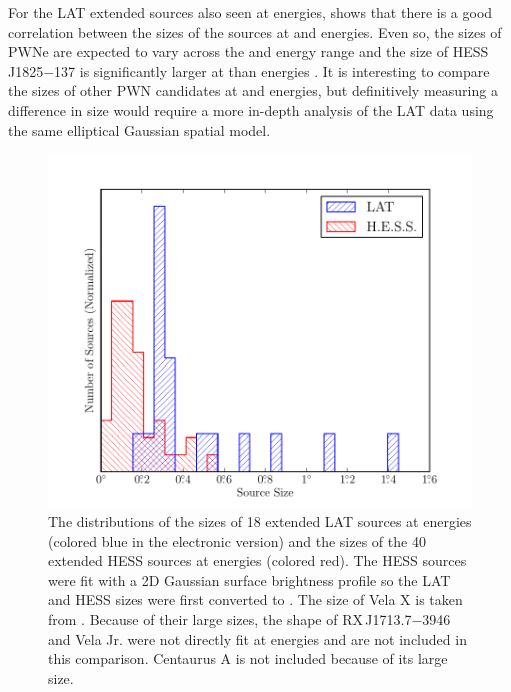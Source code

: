For the LAT extended sources also seen at \tev energies,
 shows that there is a good correlation between
the sizes of the sources at \gev and \tev energies. Even so, the sizes
of PWNe are expected to vary across the \gev and \tev energy range and
the size of HESS\,J1825$-$137 is significantly larger at \gev than \tev
energies \citep{grondin_2011a_detection-pulsar}.  It is interesting to
compare the sizes of other PWN candidates at \gev and \tev energies, but
definitively measuring a difference in size would require a more in-depth
analysis of the LAT data using the same elliptical Gaussian spatial model.

\begin{figure}[htbp]
  \includegraphics{chapters/extended_search/figures/summary_plots/gev_vs_tev_histogram_color.pdf}
  \caption{The distributions of the sizes of 18 extended LAT sources at
  \gev energies (colored blue in the electronic version) and the sizes of
  the 40 extended \ac{HESS} sources at \tev energies (colored red).  The
  \ac{HESS} sources were fit with a 2D Gaussian surface brightness profile
  so the LAT and \ac{HESS} sizes were first converted to \rsixeight.
  The \gev size of Vela X is taken from \cite{abdo_2010c_fermi-large}.
  Because of their large sizes, the shape of RX\,J1713.7$-$3946 and Vela
  Jr. were not directly fit at \tev energies and are not included in this
  comparison.  Centaurus A is not included because of its large size.}
  \end{figure}

